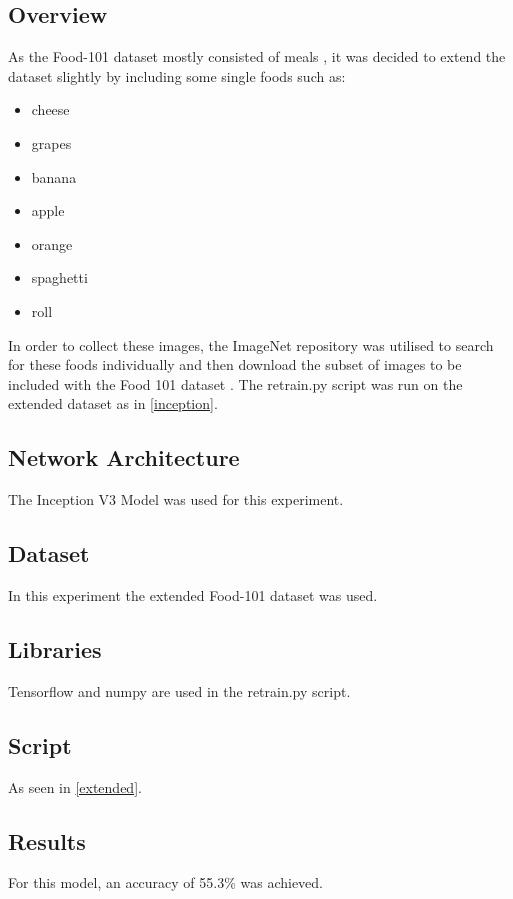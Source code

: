 \subsection*{Overview}
As the Food-101 dataset mostly consisted of meals \parencite{food101}, it was decided to extend the
dataset slightly by including some single foods such as:
\begin{itemize}
    \item{cheese}
    \item{grapes}
    \item{banana}
    \item{apple}
    \item{orange}
    \item{spaghetti}
    \item{roll}
\end{itemize}

In order to collect these images, the ImageNet repository was utilised to search for
these foods individually and then download the subset of images to be included
with the Food 101 dataset \parencite{imagenet}. The retrain.py script was run on the extended dataset as in
\ref{inception}.

\subsection*{Network Architecture}
The Inception V3 Model was used for this experiment.

\subsection*{Dataset}
In this experiment the extended Food-101 dataset was used.

\subsection*{Libraries}
Tensorflow and numpy are used in the retrain.py script.

\subsection*{Script}
As seen in \ref{extended}.

\subsection*{Results}
For this model, an accuracy of 55.3\% was achieved.

